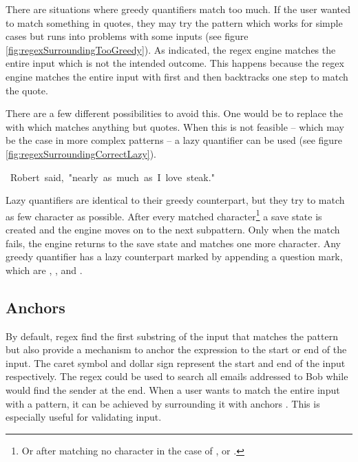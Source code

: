 There are situations where greedy quantifiers match too much. If the user wanted to match something in quotes, they may try the pattern  which works for simple cases but runs into problems with some inputs (see figure \ref{fig:regexSurroundingTooGreedy}). As indicated, the regex engine matches the entire input which is not the intended outcome. This happens because the regex engine matches the entire input with  first and then backtracks one step to match the quote.

\begin{listingBox}[title={Too greedy quantifier \pattern{".*"}},label=fig:regexSurroundingTooGreedy,width=12cm,center]
    \hspace{-5mm}
\end{listingBox}

There are a few different possibilities to avoid this. One would be to replace the  with \pattern{[\caret "]} which matches anything but quotes. When this is not feasible -- which may be the case in more complex patterns -- a lazy quantifier  can be used (see figure \ref{fig:regexSurroundingCorrectLazy}). 


\begin{listingBox}[title={Correct use of lazy quantifier \pattern{".*?"}},label=fig:regexSurroundingCorrectLazy,width=12cm,center]
    \hspace{-5mm}~Robert~said,~"nearly~as~much~as~I~love~steak."
\end{listingBox}

Lazy quantifiers are identical to their greedy counterpart, but they try to match as few character as possible. After every matched character\footnote{Or after matching no character in the case of ,  or .} a save state is created and the engine moves on to the next subpattern. Only when the match fails, the engine returns to the save state and matches one more character. Any greedy quantifier has a lazy counterpart marked by appending a question mark, which are , ,  and .

\subsection{Anchors} \label{sec:introAnchors}

By default, regex find the first substring of the input that matches the pattern but also provide a mechanism to anchor the expression to the start or end of the input. The caret symbol \pattern{\caret} and dollar sign \pattern{\dollar} represent the start and end of the input respectively. The regex  could be used to search all emails addressed to Bob while  would find the sender at the end. When a user wants to match the entire input with a pattern, it can be achieved by surrounding it with anchors \pattern{\caret\placeholder\dollar}. This is especially useful for validating input.

